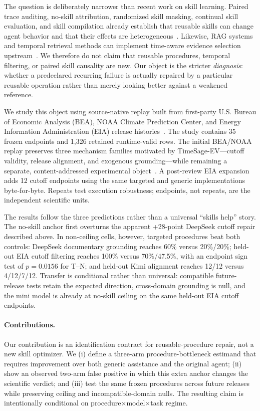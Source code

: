 The question is deliberately narrower than recent work on skill learning. Paired trace auditing, no-skill attribution, randomized skill masking, continual skill evaluation, and skill compilation already establish that reusable skills can change agent behavior and that their effects are heterogeneous~\citep{zhou2026counterfactual,dong2026agentskills,wang2026notallskills,guan2026continualskillbench,wei2026evoharness,zheng2026skillprox,xu2026hyperskill}. Likewise, RAG systems and temporal retrieval methods can implement time-aware evidence selection upstream~\citep{asai2024selfrag,yan2024crag,han2025temporalgraphs,wang2026iarag}. We therefore do not claim that reusable procedures, temporal filtering, or paired skill causality are new. Our object is the stricter \emph{diagnosis}: whether a predeclared recurring failure is actually repaired by a particular reusable operation rather than merely looking better against a weakened reference.

We study this object using source-native replay built from first-party U.S. Bureau of Economic Analysis (BEA), NOAA Climate Prediction Center, and Energy Information Administration (EIA) release histories~\citep{bea2026archive,noaa2026enso,eia2026wpsrarchive}. The study contains 35 frozen endpoints and 1,326 retained runtime-valid rows. The initial BEA/NOAA replay preserves three mechanism families motivated by TimeSage-EV---cutoff validity, release alignment, and exogenous grounding---while remaining a separate, content-addressed experimental object~\citep{yao2026timesage}. A post-review EIA expansion adds 12 cutoff endpoints using the same targeted and generic implementations byte-for-byte. Repeats test execution robustness; endpoints, not repeats, are the independent scientific units.

The results follow the three predictions rather than a universal ``skills help'' story. The no-skill anchor first overturns the apparent +28-point DeepSeek cutoff repair described above. In non-ceiling cells, however, targeted procedures beat both controls: DeepSeek documentary grounding reaches 60\% versus 20\%/20\%; held-out EIA cutoff filtering reaches 100\% versus 70\%/47.5\%, with an endpoint sign test of $p=0.0156$ for T--N; and held-out Kimi alignment reaches 12/12 versus 4/12/7/12. Transfer is conditional rather than universal: compatible future-release tests retain the expected direction, cross-domain grounding is null, and the mini model is already at no-skill ceiling on the same held-out EIA cutoff endpoints.

\paragraph{Contributions.}
Our contribution is an identification contract for reusable-procedure repair, not a new skill optimizer. We (i) define a three-arm procedure-bottleneck estimand that requires improvement over both generic assistance and the original agent; (ii) show an observed two-arm false positive in which this extra anchor changes the scientific verdict; and (iii) test the same frozen procedures across future releases while preserving ceiling and incompatible-domain nulls. The resulting claim is intentionally conditional on procedure$\times$model$\times$task regime.

